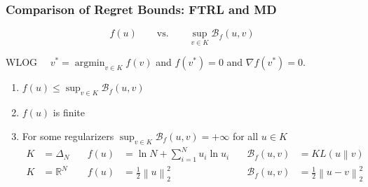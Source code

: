 \documentclass[usenames,dvipsnames]{beamer}
\DeclareMathOperator*{\argmin}{argmin}
\newcommand{\R}{\mathbb{R}}
\newcommand{\norm}[1]{\left\|#1\right\|}
\newcommand{\KL}[2]{KL\left({#1}\middle\|{#2}\right)}
\newcommand{\grad}{\nabla}
\newcommand{\Breg}{\mathcal{B}}
\begin{document}
\begin{frame}
\frametitle{Comparison of Regret Bounds: FTRL and MD}

$$
f(u) \qquad \text{vs.} \qquad \sup_{v \in K}\Breg_{f}(u,v)
$$

\vspace{0.5cm}

WLOG \ \ $v^* = \argmin_{v \in K} f(v)$ and $f(v^*) = 0$ and $\grad f(v^*) = 0$.

\vspace{0.5cm}

\everymath{\displaystyle}
\begin{enumerate}
\item $f(u) \le \sup_{v \in K} \Breg_{f}(u,v)$
\item $f(u)$ is finite
\item For some regularizers $\sup_{v \in K} \Breg_{f}(u,v) = + \infty$ for all $u \in K$
\begin{align*}
K & = \Delta_N \quad & f(u) & = \ln N + \sum_{i=1}^N u_i \ln u_i  \quad & \Breg_f(u,v) & = \KL{u}{v} \\
K & = \R^N \quad & f(u) & = \frac{1}{2}\norm{u}_2^2 \quad  & \Breg_f(u,v) & = \frac{1}{2} \norm{u - v}_2^2 \\
\end{align*}

\end{enumerate}
\end{frame}
\end{document}
